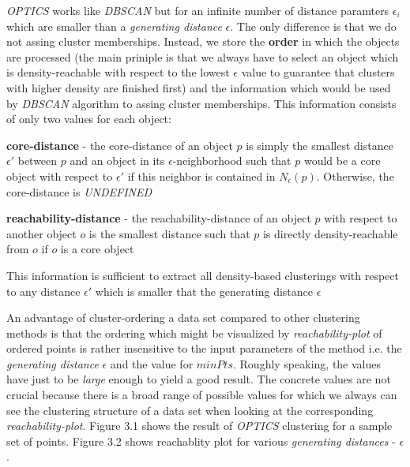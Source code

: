 \textit{OPTICS} works like \textit{DBSCAN} but for an infinite number of
distance paramters $\epsilon_i$ which are smaller than a \textit{generating distance}
$\epsilon$. The only difference is that we do not assing cluster memberships.
Instead, we store the \textbf{order} in which the objects are processed (the
main priniple is that we always have to select an object which is
density-reachable with respect to the lowest $\epsilon$ value to guarantee that
clusters with higher density are finished first) and the information which would
be used by \textit{DBSCAN} algorithm to assing cluster memberships. This
information consists of only two values for each object:


\begin{definition}\label{def:core-distance} 
\textbf{core-distance} - the core-distance of an object $p$
is simply the smallest distance $\epsilon'$ between $p$ and an object in its
$\epsilon$-neighborhood such that $p$ would be a core object with respect to
$\epsilon'$ if this neighbor is contained in $N_\epsilon(p)$. Otherwise, the
core-distance is \textit{UNDEFINED}
\end{definition}


\begin{definition}\label{def:reachability-distance} 
\textbf{reachability-distance} - the reachability-distance
of an object $p$ with respect to another object $o$ is the smallest distance such that $p$ is
directly density-reachable from $o$ if $o$ is a core object
\end{definition}

This information is sufficient to extract all density-based clusterings
with respect to any distance $\epsilon'$ which is smaller that the generating
distance $\epsilon$

An advantage of cluster-ordering a data set compared to other clustering methods
is that the ordering which might be visualized by \textit{reachability-plot} of
ordered points is rather insensitive to the input parameters of the method i.e.
the \textit{generating distance} $\epsilon$ and the value for $minPts$. Roughly
speaking, the values have just to be \textit{large} enough to yield a good
result. The concrete values are not crucial because there is a broad range of
possible values for which we always can see the clustering structure of a data
set when looking at the corresponding \textit{reachability-plot}. Figure 3.1
shows the result of \textit{OPTICS} clustering for a sample set of points.
Figure 3.2 shows reachablity plot for various \textit{generating distances} -
$\epsilon$.


